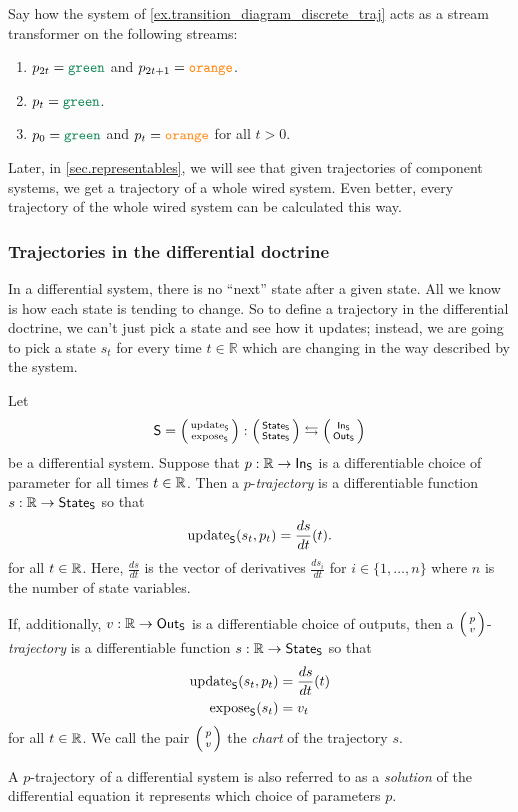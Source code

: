 \documentclass[DynamicalBook]{subfiles}
\begin{document}
\begin{exercise}
 Say how the system of \cref{ex.transition_diagram_discrete_traj} acts as a
 stream transformer on the following streams:
 \begin{enumerate}
   \item $p_{2t} = \Green$ and $p_{2t + 1} = {\color{orange} \mathtt{orange}}$.
   \item $p_t = \Green$.
   \item $p_0 = \Green$ and $p_t = {\color{orange} \mathtt{orange}}$ for
     all $t > 0$.
     \qedhere
 \end{enumerate}
\end{exercise}

Later, in \cref{sec.representables}, we will see that given trajectories of
component systems, we get a trajectory of a whole wired system. Even better,
every trajectory of the whole wired system can be calculated this way.

\subsubsection{Trajectories in the differential doctrine}\label{sec.trajectory_differential}

In a differential system, there is no ``next'' state after a given state. All we
know is how each state is tending to change. So to define a trajectory in the
differential doctrine, we can't just pick a state and see how it updates;
instead, we are going to pick a state $s_t$ for every time $t \in \mathbb{R}$
which are changing in the way described by the system. 

\begin{definition}\label{def.trajectory_diff}
  Let
  $$\Sys{S} = \lens{\update{S}}{\expose{S}} : \lens{\State{S}}{\State{S}}
 \leftrightarrows \lens{\In{S}}{\Out{S}}$$
 be a differential system. Suppose that $p : \mathbb{R} \to \mathsf{In}_{\mathsf{S}}$ is a differentiable
 choice of parameter for all times $t \in \mathbb{R}$. Then a $p$-\emph{trajectory} is a
 differentiable
 function $s : \mathbb{R} \to \mathsf{State}_{\mathsf{S}}$ so that
 $$\mathrm{update}_{\mathsf{S}}(s_t, p_t) = \frac{ds}{dt}(t).$$
 for all $t \in \mathbb{R}$. Here, $\frac{ds}{dt}$ is the vector of derivatives
 $\frac{ds_i}{dt}$ for $i \in \{1, \ldots, n\}$ where $n$ is the number of state variables.

 If, additionally, $v : \mathbb{R} \to \mathsf{Out}_{\mathsf{S}}$ is a differentiable choice of outputs,
 then a $\lens{p}{v}$-\emph{trajectory} is a differentiable function $s : \mathbb{R}
 \to \mathsf{State}_{\mathsf{S}}$ so that
 \begin{align*}
   \mathrm{update}_{\mathsf{S}}(s_t, p_t) &= \frac{ds}{dt}(t) \\
   \mathrm{expose}_{\mathsf{S}}(s_t) &= v_t
 \end{align*}
 for all $t \in \mathbb{R}$. We call the pair $\lens{p}{v}$ the \emph{chart} of the
 trajectory $s$.
\end{definition}
\begin{remark}
  A $p$-trajectory of a differential system is also referred to as a \emph{solution}
  of the differential equation it represents which choice of parameters $p$.
\end{remark}
\end{document}
